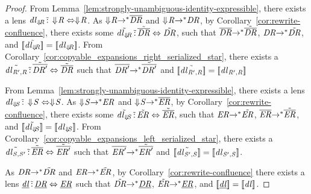 \documentclass[numbers]{sigplanconf}
\begin{document}
\begin{proof}
  From Lemma~\ref{lem:strongly-unambiguous-identity-expressible}, there exists a
  lens $\mathit{dl}_{\Downarrow\mkern-4mu \mathit{R}} \,\tilde{:}\,
  \Downarrow\mkern-4mu \mathit{R} \Leftrightarrow \Downarrow\mkern-4mu \mathit{R}$.  As
  $\Downarrow\mkern-4mu \mathit{R} {\rightarrow}^* \overline{\mathit{DR}}$ and
  $\Downarrow\mkern-4mu \mathit{R} {\rightarrow}^* \mathit{DR}$, by
  Corollary~\ref{cor:rewrite-confluence}, there exists some
  $\tilde{\mathit{dl}_{\Downarrow\mkern-4mu \mathit{R}}} \,\tilde{:}\,
  \tilde{\overline{\mathit{DR}}} \Leftrightarrow \tilde{\mathit{DR}}$,
  such that
  $\overline{\mathit{DR}} {\rightarrow}^* \tilde{\overline{\mathit{DR}}}$,
  $\mathit{DR} {\rightarrow}^* \tilde{\mathit{DR}}$, and
  $[ \! [\tilde{\mathit{dl}_{\Downarrow\mkern-4mu \mathit{R}}}] \! ] =
  [ \! [\mathit{dl}_{\Downarrow\mkern-4mu \mathit{R}}] \! ]$.
  From Corollary~\ref{cor:copyable_expansions_right_serialized_star}, there
  exists a $\tilde{\mathit{dl}_{\mathit{R}',\mathit{R}}} \,\tilde{:}\,
  \tilde{\overline{\mathit{DR}'}} \Leftrightarrow \tilde{\overline{\mathit{DR}}}$
  such that $\overline{\mathit{DR}'} {\rightarrow}^*
  \tilde{\overline{\mathit{DR}'}}$ and
  $[ \! [\tilde{\mathit{dl}_{\mathit{R}',\mathit{R}}}] \! ] =
  [ \! [\mathit{dl}_{\mathit{R}',\mathit{R}}] \! ]$

  From Lemma~\ref{lem:strongly-unambiguous-identity-expressible}, there exists a
  lens $\mathit{dl}_{\Downarrow\mkern-4mu \mathit{S}} \,\tilde{:}\,
  \Downarrow\mkern-4mu \mathit{S} \Leftrightarrow \Downarrow\mkern-4mu \mathit{S}$.  As
  $\Downarrow\mkern-4mu \mathit{S} {\rightarrow}^* \mathit{ER}$ and
  $\Downarrow\mkern-4mu \mathit{S} {\rightarrow}^* \overline{\mathit{ER}}$, by
  Corollary~\ref{cor:rewrite-confluence}, there exists some
  $\tilde{\mathit{dl}_{\Downarrow\mkern-4mu \mathit{S}}} \,\tilde{:}\,
  \tilde{\mathit{ER}} \Leftrightarrow \tilde{\overline{\mathit{ER}}}$,
  such that
  $\mathit{ER} {\rightarrow}^* \tilde{\mathit{ER}}$,
  $\overline{\mathit{ER}} {\rightarrow}^* \tilde{\overline{\mathit{ER}}}$, and
  $[ \! [\tilde{\mathit{dl}_{\Downarrow\mkern-4mu \mathit{S}}}] \! ] =
  [ \! [\mathit{dl}_{\Downarrow\mkern-4mu \mathit{S}}] \! ]$.
  From Corollary~\ref{cor:copyable_expansions_left_serialized_star}, there
  exists a $\tilde{\mathit{dl}_{\mathit{S},\mathit{S}'}} \,\tilde{:}\,
  \tilde{\overline{\mathit{ER}}} \Leftrightarrow \tilde{\overline{\mathit{ER}'}}$
  such that $\overline{\mathit{ER}'} {\rightarrow}^*
  \tilde{\overline{\mathit{ER}'}}$ and
  $[ \! [\tilde{\mathit{dl}_{\mathit{S}',\mathit{S}}}] \! ] =
  [ \! [\mathit{dl}_{\mathit{S}',\mathit{S}}] \! ]$.

  As $\mathit{DR} {\rightarrow}^* \tilde{\mathit{DR}}$ and
  $\mathit{ER} {\rightarrow}^* \tilde{\mathit{ER}}$,
  by Corollary~\ref{cor:rewrite-confluence} there exists a lens
  $\underline{\mathit{dl}} \,\tilde{:}\, \underline{\mathit{DR}} \Leftrightarrow
  \underline{\mathit{ER}}$ such that
  $\tilde{\mathit{DR}} {\rightarrow}^* \underline{\mathit{DR}}$,
  $\tilde{\mathit{ER}} {\rightarrow}^* \underline{\mathit{ER}}$, and
  $[ \! [\underline{\mathit{dl}}] \! ] = [ \! [\mathit{dl}] \! ]$.
  

\end{proof}
\end{document}

